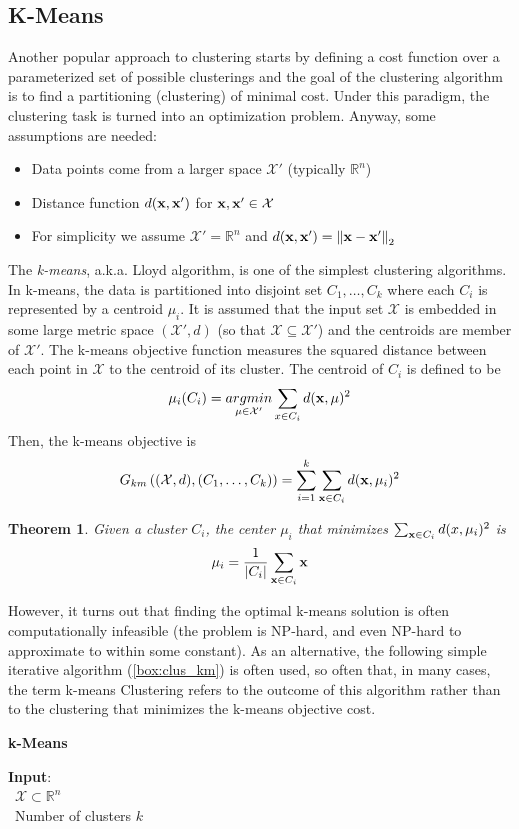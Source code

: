 \documentclass[12pt]{report}
\theoremstyle{plain}
\newtheorem{theorem}{Theorem}[chapter]
\newcommand\mcl[1]{\mathcal{#1}}
\begin{document}
\begin{flushleft}
\section{K-Means}
Another popular approach to clustering starts by defining a cost function over a parameterized set of possible clusterings and the goal of the clustering algorithm is to find a partitioning (clustering) of minimal cost. Under this paradigm, the clustering task is turned into an optimization problem. Anyway, some assumptions are needed:
\begin{itemize}
	\item Data points come from a larger space $\mcl{X}'$ (typically $\mathds{R}^n$)
	\item Distance function $d(\vb{x},\vb{x}')$ for $\vb{x},\vb{x}'\in\mcl{X}$
	\item For simplicity we assume $\mcl{X}'=\mathds{R}^n$ and $d(\vb{x},\vb{x}')=\norm{\vb{x}-\vb{x}'}_2$
\end{itemize}
The \textit{k-means}, a.k.a. Lloyd algorithm, is one of the simplest clustering algorithms. In k-means, the data is partitioned into disjoint set $C_1,\dots,C_k$ where each $C_i$ is represented by a centroid $\mu_i$. It is assumed that the input set $\mcl{X}$ is embedded in some large metric space $(\mcl{X}',d)$ (so that $\mcl{X}\subseteq\mcl{X}'$) and the centroids are member of $\mcl{X}'$. The k-means objective function measures the squared distance between each point in $\mcl{X}$ to the centroid of its cluster. The centroid of $C_i$ is defined to be
\[ \mu_i(C_i)=\underset{\mu\in\mcl{X}'}{argmin}\sum_{x\in C_i}d(\vb{x},\mu)^2 \]
Then, the k-means objective is 
\[ G_{km}\left((\mcl{X},d),(C_1,\dots,C_k)\right)=\sum_{i=1}^k\sum_{\vb{x}\in C_i}d(\vb{x},\mu_i)^2 \]
\begin{theorem}
	Given a cluster $C_i$, the center $\mu_i$ that minimizes $\sum_{\vb{x}\in C_i}d(x,\mu_i)^2$ is
	\[ \mu_i=\frac{1}{\abs{C_i}}\sum_{\vb{x}\in C_i}\vb{x} \]
\end{theorem}
However, it turns out that finding the optimal k-means solution is often computationally infeasible (the problem is NP-hard, and even NP-hard to approximate to within some constant). As an alternative, the following simple iterative algorithm (\ref{box:clus_km}) is often used, so often that, in many cases, the term k-means Clustering refers to the outcome of this algorithm rather than to the clustering that minimizes the k-means objective cost.
\begin{tcolorbox}
	\begin{center}
		\textbf{k-Means}
	\end{center}
	\textbf{Input}:\\
	\-\ $\mcl{X}\subset\mathds{R}^n$\\
	\-\ Number of clusters $k$\\
	

\end{tcolorbox}
\end{flushleft}
\end{document}
